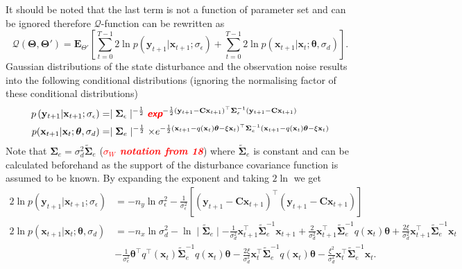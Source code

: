 \documentclass[]{article}
\newcommand{\dean}[1]{\textsf{\emph{\textbf{\textcolor{red}{#1}}}}}
\begin{document}
 It should be noted that the last term is not a function of parameter set and can be ignored therefore $\mathcal Q$-function can be rewritten as
\begin{equation}\label{eq:QIntermsofJointDist}
\mathcal Q(\boldsymbol \Theta,\boldsymbol\Theta')=\mathbf E_{\Theta'}\left[\sum_{t=0}^{T-1}2\ln p(\mathbf y_{t+1}|\mathbf x_{t+1}; \sigma_{\epsilon})+\sum_{t=0}^{T-1}2\ln p(\mathbf x_{t+1}|\mathbf x_{t};\boldsymbol \theta ,\sigma_d)\right].
\end{equation}
Gaussian distributions of the state disturbance and the observation noise results into the following conditional distributions (ignoring the normalising factor of these conditional distributions)
\begin{align}
 p\left(\mathbf y_{t+1}|\mathbf x_{t+1};\sigma_{\epsilon}\right)&= \mid\boldsymbol\Sigma_{\epsilon}\mid^{-\frac{1}{2}}  \dean{exp}^{-\frac{1}{2}(\mathbf y_{t+1}-\mathbf C\mathbf  x_{t+1})^\top\boldsymbol\Sigma_{\epsilon}^{-1}(\mathbf y_{t+1}-\mathbf C\mathbf  x_{t+1}) } \\
p(\mathbf x_{t+1}|\mathbf x_{t};\boldsymbol \theta ,\sigma_d)&= \mid\boldsymbol\Sigma_{e}\mid^{-\frac{1}{2}} \times e^{-\frac{1}{2}(\mathbf x_{t+1}-q(\mathbf  x_t)\boldsymbol\theta-\xi  \mathbf x_t)^\top\boldsymbol\Sigma_e^{-1}(\mathbf x_{t+1}-q( \mathbf x_t)\boldsymbol\theta-\xi \mathbf  x_t)}
\end{align}
Note that $\boldsymbol\Sigma_e=\sigma_d^2\tilde{\boldsymbol\Sigma}_e$ (\dean{$\sigma_W$ notation from 18}) where $\tilde{\boldsymbol\Sigma}_e$ is constant and can be calculated beforehand as the support of the disturbance covariance function is assumed to be known. By expanding the exponent and taking $2\ln$ we get
\begin{align}\label{eq:CondititionDist1}
2\ln p\left(\mathbf y_{t+1}|\mathbf x_{t+1};\sigma_{\epsilon}\right)&=-n_y\ln \sigma_{\epsilon}^2-\frac{1}{\sigma_{\epsilon}^2}\left[ (\mathbf y_{t+1}-\mathbf C\mathbf  x_{t+1})^\top(\mathbf y_{t+1}-\mathbf C\mathbf  x_{t+1})\right]  \\
2\ln p(\mathbf x_{t+1}|\mathbf x_{t};\boldsymbol \theta ,\sigma_d)&=-n_x\ln\sigma_d^2-\ln\mid\tilde{\boldsymbol\Sigma}_e\mid-\frac{1}{\sigma_d^2}\mathbf x_{t+1}^\top\tilde{\boldsymbol\Sigma}_e^{-1}\mathbf x_{t+1}+\frac{2}{\sigma_d^2}\mathbf x_{t+1}^\top\tilde{\boldsymbol\Sigma}_e^{-1}q( \mathbf x_t)\boldsymbol\theta+\frac{2\xi}{\sigma_d^2}\mathbf x_{t+1}^\top\tilde{\boldsymbol\Sigma}_e^{-1}\mathbf x_t \nonumber \\
&-\frac{1}{\sigma_e^2}\boldsymbol\theta^\top q^\top(\mathbf x_t)\tilde{\boldsymbol\Sigma}_e^{-1}q(\mathbf x_t)\boldsymbol\theta-\frac{2\xi}{\sigma_d^2} \mathbf x_t^\top\tilde{\boldsymbol\Sigma}_e^{-1}q(\mathbf x_t)\boldsymbol\theta-\frac{\xi^2}{\sigma_d^2}\mathbf x_t^\top\tilde{\boldsymbol\Sigma}_e^{-1}\mathbf x_t. \label{eq:CondititionDist2}
\end{align}
\end{document}
